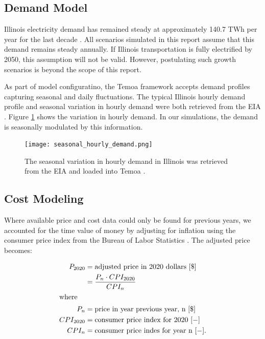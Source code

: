 \subsection{Demand Model}
Illinois electricity demand has remained steady at approximately 140.7 TWh per 
year for the last decade 
\cite{us_energy_information_administration_eia_illinois_2020}. All scenarios 
simulated in this report assume that this demand remains steady annually.
If Illinois transportation is fully electrified by 2050, this assumption will 
not be valid.  However, postulating such growth scenarios is  beyond the scope 
of this report. 

As part of model configuratino, the Temoa framework accepts demand profiles 
capturing seasonal and daily fluctuations. The typical Illinois hourly demand profile and seasonal variation in hourly demand were both retrieved from the \gls{EIA} 
\cite{us_energy_information_administration_eia_illinois_2020}. Figure 
\ref{fig:seasonal_hourly_demand} shows the variation in hourly demand.
In our simulations, the demand is seasonally modulated by this information.



\begin{figure}[htbp!]
        \begin{center}
               \texttt{[image: seasonal\_hourly\_demand.png]}
        \caption{The seasonal variation in hourly demand in Illinois was retrieved from the \gls{EIA} 
        \cite{us_energy_information_administration_eia_illinois_2020} and 
        loaded into Temoa \cite{decarolis_modelling_2016}.}
        \label{fig:seasonal_hourly_demand}
        \end{center}
\end{figure}

\subsection{Cost Modeling}
Where available price and cost data could only be found for previous years, we 
                accounted for the time value of money by adjusting for 
                inflation using the consumer price index from the 
                Bureau of Labor Statistics \cite{bls_consumer_2021}. The 
                adjusted price becomes: 

\begin{align}
        P_{2020} &= \mbox{adjusted price in 2020 dollars }[\$]\\
                &= \frac{P_{n} \cdot CPI_{2020}}{CPI_{n}}\\
        \intertext{where}
        P_n &= \mbox{price in year previous year, n } [\$]\\
        CPI_{2020} &= \mbox{consumer price index for 2020 } [-]\\
        CPI_n &= \mbox{consumer price indes for year n } [-].
\end{align}


